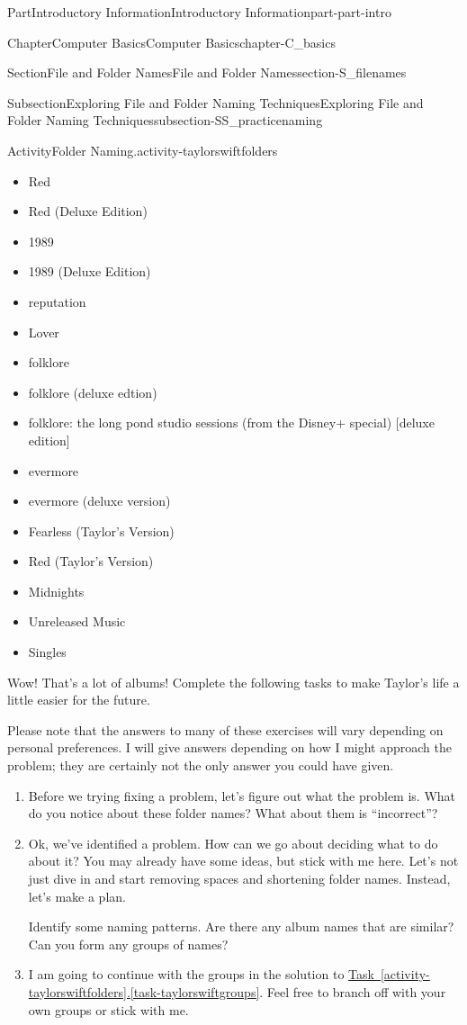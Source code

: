\documentclass[oneside,10pt,]{book}
\newcommand{\xreffont}{\relax}
\begin{document}
\begin{partptx}{Part}{Introductory Information}{}{Introductory Information}{}{}{part-part-intro}
\begin{chapterptx}{Chapter}{Computer Basics}{}{Computer Basics}{}{}{chapter-C_basics}
\begin{sectionptx}{Section}{File and Folder Names}{}{File and Folder Names}{}{}{section-S_filenames}
\begin{subsectionptx}{Subsection}{Exploring File and Folder Naming Techniques}{}{Exploring File and Folder Naming Techniques}{}{}{subsection-SS_practicenaming}
\begin{activity}{Activity}{Folder Naming.}{activity-taylorswiftfolders}
\begin{multicols}{2}
\begin{itemize}[label=\textbullet]
\item{}Red%
\item{}Red (Deluxe Edition)%
\item{}1989%
\item{}1989 (Deluxe Edition)%
\item{}reputation%
\item{}Lover%
\item{}folklore%
\item{}folklore (deluxe edtion)%
\item{}folklore: the long pond studio sessions (from the Disney+ special) [deluxe edition]%
\item{}evermore%
\item{}evermore (deluxe version)%
\item{}Fearless (Taylor's Version)%
\item{}Red (Taylor's Version)%
\item{}Midnights%
\item{}Unreleased Music%
\item{}Singles%
\end{itemize}
\end{multicols}
%
\par
Wow! That's a lot of albums! Complete the following tasks to make Taylor's life a little easier for the future.%
\par
Please note that the answers to many of these exercises will vary depending on personal preferences. I will give answers depending on how I might approach the problem; they are certainly not the only answer you could have given.%
\begin{enumerate}[font=\bfseries,label=(\alph*),ref=\alph*]%
\item{}Before we trying fixing a problem, let's figure out what the problem is. What do you notice about these folder names? What about them is ``incorrect''?%
\item\label{task-taylorswiftgroups}Ok, we've identified a problem. How can we go about deciding what to do about it? You may already have some ideas, but stick with me here. Let's not just dive in and start removing spaces and shortening folder names. Instead, let's make a plan.%
\par
Identify some naming patterns. Are there any album names that are similar? Can you form any groups of names?%
\item{}I am going to continue with the groups in the solution to \hyperref[task-taylorswiftgroups]{Task~{\xreffont\ref{activity-taylorswiftfolders}}.{\xreffont\ref{task-taylorswiftgroups}}}. Feel free to branch off with your own groups or stick with me.%

\end{enumerate}
\end{activity}
\end{subsectionptx}
\end{sectionptx}
\end{chapterptx}
\end{partptx}
\end{document}
